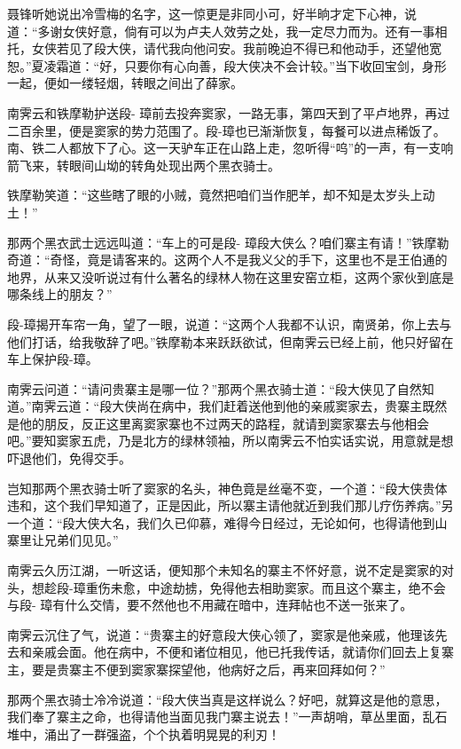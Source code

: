 \documentclass[12pt,oneside]{book}
\begin{document}
聂锋听她说出冷雪梅的名字，这一惊更是非同小可，好半晌才定下心神，说道：``多谢女侠好意，倘有可以为卢夫人效劳之处，我一定尽力而为。还有一事相托，女侠若见了段大侠，请代我向他问安。我前晚迫不得已和他动手，还望他宽恕。''夏凌霜道：``好，只要你有心向善，段大侠决不会计较。''当下收回宝剑，身形一起，便如一缕轻烟，转眼之间出了薛家。

南霁云和铁摩勒护送段-
璋前去投奔窦家，一路无事，第四天到了平卢地界，再过二百余里，便是窦家的势力范围了。段-璋也已渐渐恢复，每餐可以进点稀饭了。南、铁二人都放下了心。这一天驴车正在山路上走，忽听得``呜''的一声，有一支响箭飞来，转眼间山坳的转角处现出两个黑衣骑士。

铁摩勒笑道：``这些瞎了眼的小贼，竟然把咱们当作肥羊，却不知是太岁头上动土！''

那两个黑衣武士远远叫道：``车上的可是段-
璋段大侠么？咱们寨主有请！''铁摩勒奇道：``奇怪，竟是请客来的。这两个人不是我义父的手下，这里也不是王伯通的地界，从来又没听说过有什么著名的绿林人物在这里安窑立柜，这两个家伙到底是哪条线上的朋友？''

段-璋揭开车帘一角，望了一眼，说道：``这两个人我都不认识，南贤弟，你上去与他们打话，给我敬辞了吧。''铁摩勒本来跃跃欲试，但南霁云已经上前，他只好留在车上保护段-璋。

南霁云问道：``请问贵寨主是哪一位？''那两个黑衣骑士道：``段大侠见了自然知道。''南霁云道：``段大侠尚在病中，我们赶着送他到他的亲戚窦家去，贵寨主既然是他的朋反，反正这里离窦家寨也不过两天的路程，就请到窦家寨去与他相会吧。''要知窦家五虎，乃是北方的绿林领袖，所以南霁云不怕实话实说，用意就是想吓退他们，免得交手。

岂知那两个黑衣骑士听了窦家的名头，神色竟是丝毫不变，一个道：``段大侠贵体违和，这个我们早知道了，正是因此，所以寨主请他就近到我们那儿疗伤养病。''另一个道：``段大侠大名，我们久已仰慕，难得今日经过，无论如何，也得请他到山寨里让兄弟们见见。''

南霁云久历江湖，一听这话，便知那个未知名的寨主不怀好意，说不定是窦家的对头，想趁段-璋重伤未愈，中途劫掳，免得他去相助窦家。而且这个寨主，绝不会与段-
璋有什么交情，要不然他也不用藏在暗中，连拜帖也不送一张来了。

南霁云沉住了气，说道：``贵寨主的好意段大侠心领了，窦家是他亲戚，他理该先去和亲戚会面。他在病中，不便和诸位相见，他已托我传话，就请你们回去上复寨主，要是贵寨主不便到窦家寨探望他，他病好之后，再来回拜如何？''

那两个黑衣骑士冷冷说道：``段大侠当真是这样说么？好吧，就算这是他的意思，我们奉了寨主之命，也得请他当面见我门寨主说去！''一声胡哨，草丛里面，乱石堆中，涌出了一群强盗，个个执着明晃晃的利刃！
\end{document}
